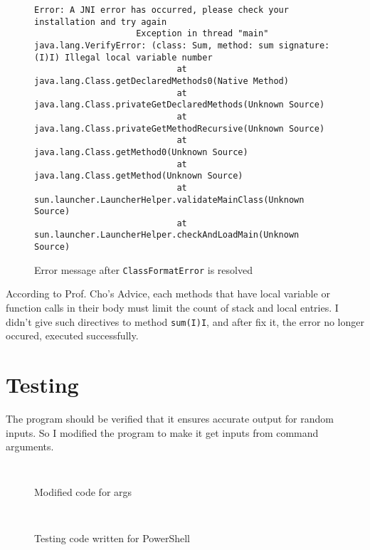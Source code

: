 \documentclass[a4paper, 12pt]{article}
\begin{document}
            \begin{figure}[H]
                \begin{lstlisting}[gobble=20]
                    Error: A JNI error has occurred, please check your installation and try again
                    Exception in thread "main" java.lang.VerifyError: (class: Sum, method: sum signature: (I)I) Illegal local variable number
                            at java.lang.Class.getDeclaredMethods0(Native Method)
                            at java.lang.Class.privateGetDeclaredMethods(Unknown Source)
                            at java.lang.Class.privateGetMethodRecursive(Unknown Source)
                            at java.lang.Class.getMethod0(Unknown Source)
                            at java.lang.Class.getMethod(Unknown Source)
                            at sun.launcher.LauncherHelper.validateMainClass(Unknown Source)
                            at sun.launcher.LauncherHelper.checkAndLoadMain(Unknown Source)
                \end{lstlisting}
        
                \centering        
                \caption{Error message after \texttt{ClassFormatError} is resolved}
            \end{figure}

            According to Prof. Cho's Advice, each methods that have local variable or function calls in their body must limit the count of stack and local entries. I didn't give such directives to method \texttt{sum(I)I}, and after fix it, the error no longer occured, executed successfully.
    \section{Testing}
    The program should be verified that it ensures accurate output for random inputs. So I modified the program to make it get inputs from command arguments.
    \begin{figure}[H]
        \begin{lstlisting}
        
        \end{lstlisting}

        \centering        
        \caption{Modified code for args}
    \end{figure}

    \begin{figure}[H]
        \begin{lstlisting}
        
        \end{lstlisting}

        \centering        
        \caption{Testing code written for PowerShell}
    \end{figure}
\end{document}
